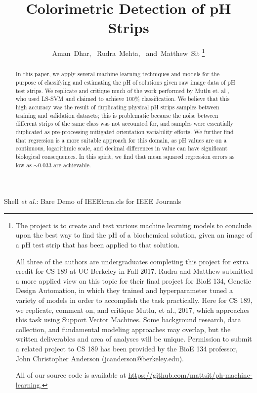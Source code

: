 \documentclass[journal]{IEEEtran}
\begin{document}
\title{Colorimetric Detection of pH Strips}
\author{Aman~Dhar,~
        Rudra~Mehta,~
        and~Matthew~Sit
\thanks{The project is to create and test various machine learning models to conclude upon the best way to find the pH of a biochemical solution, given an image of a pH test strip that has been applied to that solution.

All three of the authors are undergraduates completing this project for extra credit for CS 189 at UC Berkeley in Fall 2017. Rudra and Matthew submitted a more applied view on this topic for their final project for BioE 134, Genetic Design Automation, in which they trained and hyperparameter tuned a variety of models in order to accomplish the task practically. Here for CS 189, we replicate, comment on, and critique Mutlu, et al., 2017, which approaches this task using Support Vector Machines. Some background research, data collection, and fundamental modeling approaches may overlap, but the written deliverables and area of analyses will be unique. Permission to submit a related project to CS 189 has been provided by the BioE 134 professor, John Christopher Anderson (jcanderson@berkeley.edu).

All of our source code is available at \url{https://github.com/mattsit/ph-machine-learning.}}}

%
{Shell \MakeLowercase{\textit{et al.}}: Bare Demo of IEEEtran.cls for IEEE Journals}

\maketitle

\begin{abstract}
In this paper, we apply several machine learning techniques and models for the purpose of classifying and estimating the pH of solutions given raw image data of pH test strips. We replicate and critique much of the work performed by Mutlu et. al \cite{mutlu}, who used LS-SVM and claimed to achieve 100\% classification. We believe that this high accuracy was the result of duplicating physical pH strips samples between training and validation datasets; this is problematic because the noise between different strips of the same class was not accounted for, and samples were essentially duplicated as pre-processing mitigated orientation variability efforts. We further find that regression is a more suitable approach for this domain, as pH values are on a continuous, logarithmic scale, and decimal differences in value can have significant biological consequences. In this spirit, we find that mean squared regression errors as low as $\sim$0.033 are achievable.
\end{abstract}
\end{document}

